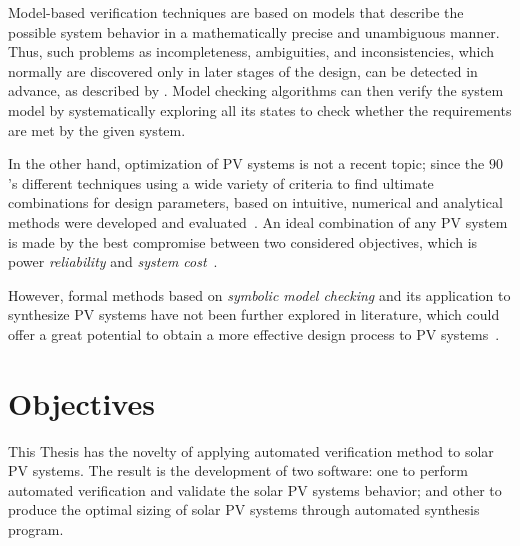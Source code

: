 Model-based verification techniques are based on models that describe the possible system behavior in a mathematically precise and unambiguous manner. Thus, such problems as incompleteness, ambiguities, and inconsistencies, which normally are discovered only in later stages of the design, can be detected in advance, as described by \cite{Trindade}. 
Model checking algorithms can then verify the system model by systematically exploring all its states to check whether the requirements are met by the given system.
%
%

In the other hand, optimization of PV systems is not a recent topic; since the $90$'s different techniques using a wide variety of criteria to find ultimate combinations for design parameters, based on intuitive, numerical and analytical methods were developed and evaluated~\cite{Applasamy2011}. An ideal combination of any PV system is made by the best compromise between two considered objectives, which is power \textit{reliability} and \textit{system cost}~\cite{Alsadi2018}.
 
However, formal methods based on \textit{symbolic model checking} and its application 
to synthesize PV systems have not been further explored in literature, which could offer 
a great potential to obtain a more effective design process to PV systems~\cite{ClarkeHV18}.


\section{Objectives}
This Thesis has the novelty of applying automated verification method to solar PV systems. The result is the development of two software: one to perform automated verification and validate the solar PV systems behavior; and other to produce the optimal sizing of solar PV systems through automated synthesis program.

